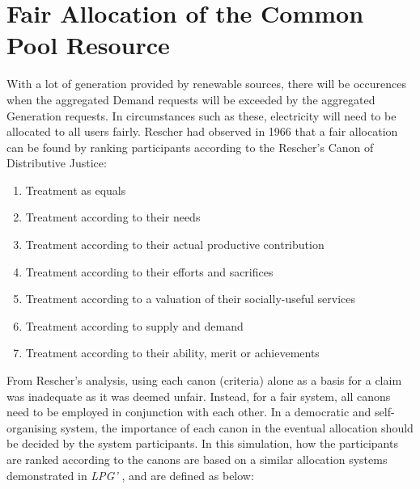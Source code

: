 \section*{Fair Allocation of the Common Pool Resource}
With a lot of generation provided by renewable sources, there will be occurences when the aggregated Demand requests will be exceeded by the aggregated Generation requests. In circumstances such as these, electricity will need to be allocated to all users fairly. {\color{red} Rescher had observed in 1966 that a fair allocation can be found by ranking participants according to the Rescher's Canon of Distributive Justice:}

\begin{enumerate} %
	\item Treatment as equals
	\item Treatment according to their needs
	\item Treatment according to their actual productive contribution
	\item Treatment according to their efforts and sacrifices
	\item Treatment according to a valuation of their socially-useful services
	\item Treatment according to supply and demand
	\item Treatment according to their ability, merit or achievements
\end{enumerate}


From Rescher's analysis, using each canon (criteria) alone as a basis for a claim was inadequate as it was deemed unfair. Instead, for a fair system, all canons need to be employed in conjunction with each other. In a democratic and self-organising system, the importance of each canon in the eventual allocation should be decided by the system participants. In this simulation, how the participants are ranked according to the canons are based on a similar allocation systems demonstrated in \textit{LPG'}\cite{PittSASO2012} , and are defined as below:

